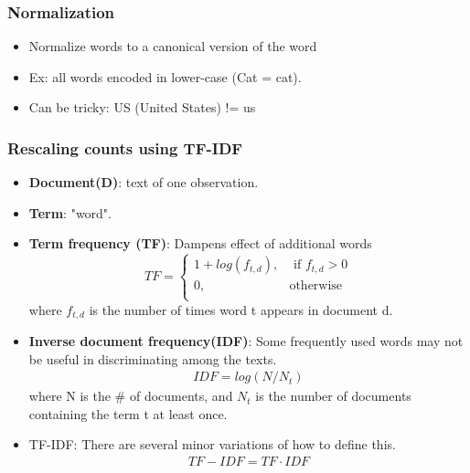 \documentclass[12pt, oneside]{article}
\begin{document}
\subsubsection{Normalization}
\begin{itemize}
    \item Normalize words to a canonical version of the word
    \item Ex: all words encoded in lower-case (Cat = cat).
    \item Can be tricky: US (United States) != us
\end{itemize}

\subsubsection{Rescaling counts using TF-IDF}

\begin{itemize}
    \item \textbf{Document(D)}: text of one observation. 
    \item \textbf{Term}: "word".
    \item \textbf{Term frequency (TF)}: Dampens effect of additional words\\
    $$TF = \begin{cases}
        1 + log(f_{t,d}), & \text{ if } f_{t,d} > 0 \\
        0, & \text{otherwise}\\
    \end{cases} $$
    where $f_{t,d}$ is the number of times word t appears in document d. \item \textbf{Inverse document frequency(IDF)}: Some frequently used words may not be useful in discriminating among the texts. 
    \begin{align*}
        IDF = log(N/N_t)
    \end{align*}
    where N is the \# of documents, and $N_t$ is the number of documents containing the term t at least once. 
    \item TF-IDF: There are several minor variations of how to define this. 
    \begin{align}
        TF - IDF = TF \cdot IDF
    \end{align}
\end{itemize}
\end{document}
